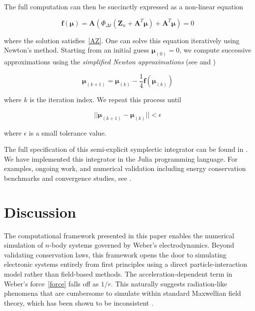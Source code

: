 \documentclass[12pt,a4paper]{article}
\theoremstyle{definition}
\theoremstyle{remark}
\begin{document}
The full computation can then be succinctly expressed as a non-linear equation

\begin{equation}
    \mathbf{f}(\boldsymbol{\mu}) = \mathbf{A} (\Phi_{\Delta t}(\mathbf{Z}_n + \mathbf{A}^T \boldsymbol{\mu}) + \mathbf{A}^T \boldsymbol{\mu}) = 0
\end{equation}

where the solution satisfies~\eqref{AZ}. One can solve this equation iteratively using Newton's method. Starting from an initial guess $\boldsymbol{\mu}_{(0)} = 0$, we compute successive approximations using the \textit{simplified Newton approximations} (see \citep{Jayawardana2023} and \citep{Hairer2006})

\begin{equation}
    \boldsymbol{\mu}_{(k+1)} = \boldsymbol{\mu}_{(k)} - \frac{1}{4} \mathbf{f}(\boldsymbol{\mu}_{(k)})
\end{equation}

where $k$ is the iteration index. We repeat this process until

\begin{equation}
    ||\boldsymbol{\mu}_{(k+1)} - \boldsymbol{\mu}_{(k)}|| < \epsilon
\end{equation}

where $\epsilon$ is a small tolerance value.

The full specification of this semi-explicit symplectic integrator can be found in \citep{Jayawardana2023}. We have implemented this integrator in the Julia programming language. For examples, ongoing work, and numerical validation including energy conservation benchmarks and convergence studies, see \citep{WeberElectrodynamics.jl}.

\section{Discussion}

The computational framework presented in this paper enables the numerical simulation of $n$-body systems governed by Weber's electrodynamics. Beyond validating conservation laws, this framework opens the door to simulating electronic systems entirely from first principles using a direct particle-interaction model rather than field-based methods. The acceleration-dependent term in Weber's force~\eqref{force} falls off as $1/r$. This naturally suggests radiation-like phenomena that are cumbersome to simulate within standard Maxwellian field theory, which has been shown to be inconsistent \citep{vlaenderen2016}.
\end{document}
